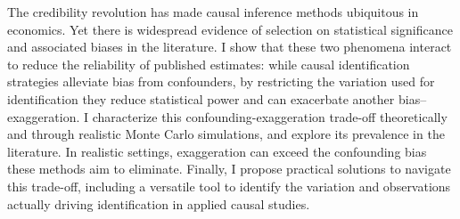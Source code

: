 The credibility revolution has made causal inference methods ubiquitous in economics. Yet there is widespread evidence of selection on statistical significance and associated biases in the literature. I show that these two phenomena interact to reduce the reliability of published estimates: while causal identification strategies alleviate bias from confounders, by restricting the variation used for identification they reduce statistical power and can exacerbate another bias--exaggeration. I characterize this confounding-exaggeration trade-off theoretically and through realistic Monte Carlo simulations, and explore its prevalence in the literature. In realistic settings, exaggeration can exceed the confounding bias these methods aim to eliminate. Finally, I propose practical solutions to navigate this trade-off, including a versatile tool to identify the variation and observations actually driving identification in applied causal studies.
